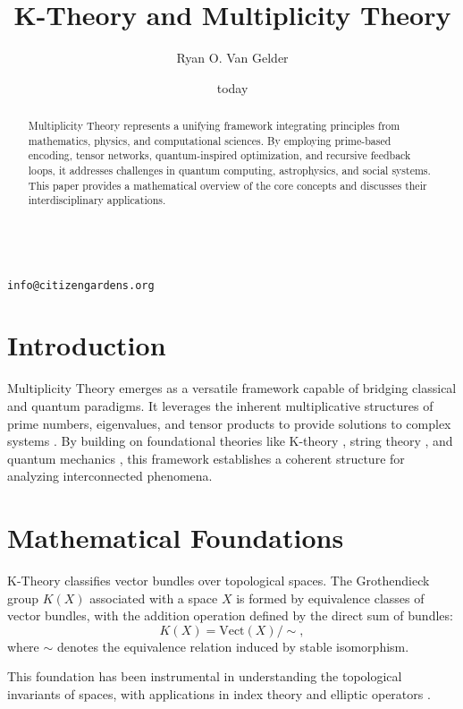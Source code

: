 \documentclass{article}
\theoremstyle{plain}
\begin{document}
\title{K-Theory and Multiplicity Theory}

\author{Ryan O. Van Gelder}
 \\ \texttt{info@citizengardens.org}
\date{today}

\maketitle

\begin{abstract}
Multiplicity Theory represents a unifying framework integrating principles from mathematics, physics, and computational sciences. By employing prime-based encoding, tensor networks, quantum-inspired optimization, and recursive feedback loops, it addresses challenges in quantum computing, astrophysics, and social systems. This paper provides a mathematical overview of the core concepts and discusses their interdisciplinary applications.
\end{abstract}

\section{Introduction}
Multiplicity Theory emerges as a versatile framework capable of bridging classical and quantum paradigms. It leverages the inherent multiplicative structures of prime numbers, eigenvalues, and tensor products to provide solutions to complex systems \cite{atiyah1966kTheory, karoubi1978kTheory}. By building on foundational theories like K-theory \cite{hatcher2003algebraic}, string theory \cite{witten1995string}, and quantum mechanics \cite{weinberg1995quantum}, this framework establishes a coherent structure for analyzing interconnected phenomena.

\section{Mathematical Foundations}
K-Theory classifies vector bundles over topological spaces. The Grothendieck group $K(X)$ associated with a space $X$ is formed by equivalence classes of vector bundles, with the addition operation defined by the direct sum of bundles:
\begin{equation}
K(X) = \text{Vect}(X)/\sim,
\end{equation}
where $\sim$ denotes the equivalence relation induced by stable isomorphism.

This foundation has been instrumental in understanding the topological invariants of spaces, with applications in index theory and elliptic operators \cite{hatcher2003algebraic}.
\end{document}
